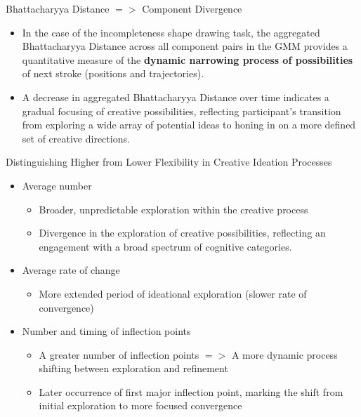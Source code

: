 \documentclass[pdf]{beamer}
\begin{document}
\begin{frame}{Bhattacharyya Distance $=>$ Component Divergence}
\begin{itemize}
    \item<1-> In the case of the incompleteness shape drawing task, the aggregated Bhattacharyya Distance across all component pairs in the GMM provides a quantitative measure of the \textbf{dynamic narrowing process of possibilities} of next stroke (positions and trajectories).
    \vspace{1em}
    \item<2-> A decrease in aggregated Bhattacharyya Distance over time indicates a gradual focusing of creative possibilities, reflecting participant’s transition from exploring a wide array of potential ideas to honing in on a more defined set of creative directions.
\end{itemize}
\end{frame}

\begin{frame}{Distinguishing Higher from Lower Flexibility in Creative Ideation Processes}
\begin{itemize}
    \item<1-> \alert{Average number}
        \begin{itemize}
            \item Broader, unpredictable exploration within the creative process
            \item Divergence in the exploration of creative possibilities, reflecting an engagement with a broad spectrum of cognitive categories.
        \end{itemize}
    \vspace{1em}
    \item<2-> \alert{Average rate of change}
        \begin{itemize}
            \item More extended period of ideational exploration (slower rate of convergence)
        \end{itemize}
    \vspace{1em}
    \item<3-> \alert{Number and timing of inflection points}
        \begin{itemize}
            \item A greater number of inflection points $=>$ A more dynamic process shifting between exploration and refinement
            \item Later occurrence of first major inflection point, marking the shift from initial exploration to more focused convergence
        \end{itemize}
\end{itemize}
\end{frame}
\end{document}

